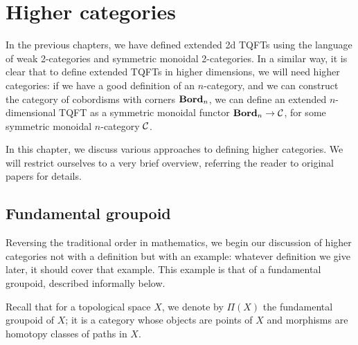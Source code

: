 \chapter{Higher categories}\label{c:higher-cat}

In the previous chapters, we have defined extended 2d TQFTs using
the language of weak 2-categories and symmetric monoidal 2-categories. In a
similar way, it is clear that to define extended TQFTs in higher
dimensions, we will need higher categories: if we have a good definition of
an $n$-category, and we can construct the category of cobordisms with
corners $\mathbf{Bord}_n$, we can define an extended $n$-dimensional TQFT as a
symmetric monoidal functor $\mathbf{Bord}_n\to \mathcal{C}$, for some symmetric monoidal
$n$-category $\mathcal{C}$.

In this chapter, we discuss various approaches to defining higher categories. We
will restrict ourselves to a very brief overview, referring the reader to
original papers for details.

\section{Fundamental groupoid}\label{s:fundamental-groupoid}

Reversing the traditional order in mathematics, we begin our discussion of
higher categories not with a definition but with an example: whatever definition
we give later, it should cover that example. This example is that of a
fundamental groupoid, described informally below.


Recall that for a topological space $X$, we denote by $\Pi(X)$ the fundamental
groupoid of $X$; it is a category whose objects are points of $X$ and morphisms
are homotopy classes of paths in $X$.

